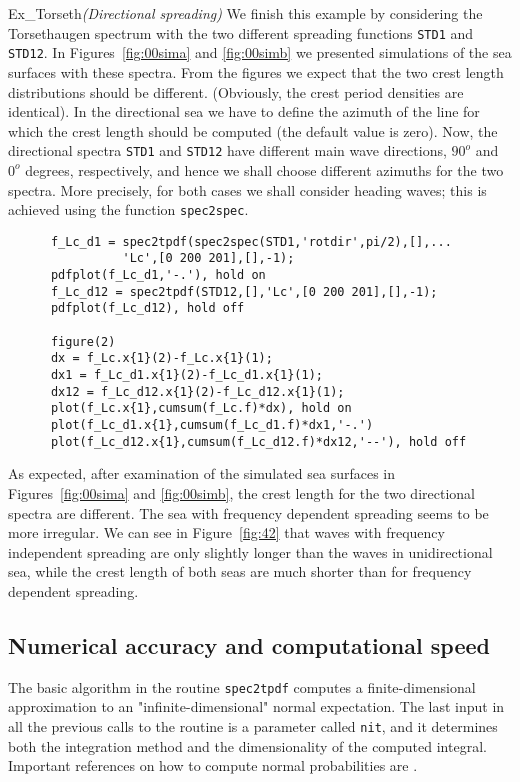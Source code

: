 \begin{cex}{Ex_Torseth}{\sl (Directional spreading)} 
We finish this example by considering the Torsethaugen spectrum
with the two different spreading functions {\tt STD1} and {\tt STD12}.
In Figures~\ref{fig:00sima} and \ref{fig:00simb} we presented simulations of the sea surfaces
with these spectra. From the figures we expect that the two crest length
distributions should be different.
(Obviously, the crest period densities are identical).
In the directional sea we have to define the azimuth of the
line for which the crest length should be computed (the default value
is zero). Now, the directional spectra {\tt STD1} and {\tt STD12}
have different main wave directions, $90^o$ and $0^o$ degrees, respectively,
and hence we shall choose different azimuths for the two spectra.
More precisely, for both cases we shall consider heading waves; this
is achieved using the function {\tt spec2spec}.
{\small\begin{verbatim}
      f_Lc_d1 = spec2tpdf(spec2spec(STD1,'rotdir',pi/2),[],...
                'Lc',[0 200 201],[],-1);
      pdfplot(f_Lc_d1,'-.'), hold on
      f_Lc_d12 = spec2tpdf(STD12,[],'Lc',[0 200 201],[],-1);
      pdfplot(f_Lc_d12), hold off

      figure(2)
      dx = f_Lc.x{1}(2)-f_Lc.x{1}(1);
      dx1 = f_Lc_d1.x{1}(2)-f_Lc_d1.x{1}(1);
      dx12 = f_Lc_d12.x{1}(2)-f_Lc_d12.x{1}(1);
      plot(f_Lc.x{1},cumsum(f_Lc.f)*dx), hold on
      plot(f_Lc_d1.x{1},cumsum(f_Lc_d1.f)*dx1,'-.')
      plot(f_Lc_d12.x{1},cumsum(f_Lc_d12.f)*dx12,'--'), hold off
\end{verbatim}}

As expected, after examination of the simulated sea surfaces in
Figures~\ref{fig:00sima} and \ref{fig:00simb}, the crest length
for the two directional spectra are different.
The sea with frequency dependent spreading seems to be more irregular.
We can see in Figure~\ref{fig:42} that waves with frequency
independent spreading are only slightly
longer than the waves in unidirectional sea, while the
crest length of both seas are much shorter than for frequency
dependent spreading. 
\end{cex}

\subsection{Numerical accuracy and computational speed}
\label{subsec:numerical accuracy}
The basic algorithm in the routine {\tt spec2tpdf} computes a
finite-dimensional approximation to an "infinite-dimensional"
normal expectation. The last input in all the previous calls
to the routine is a parameter called {\tt nit}, and it
determines both the integration method and the dimensionality
of the computed integral.
Important references on how to compute normal probabilities are
\cite{AmbartzumianEtal1998Multinormal,Brodtkorb2004Probability,
Brodtkorb2006Evaluating,Genz1992Numerical,GenzAndKwong2000Numerical,
Rychlik1992Confidence}.

